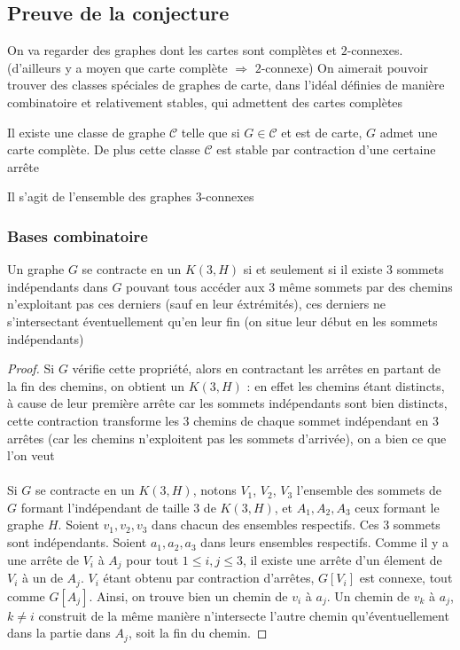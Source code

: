 \documentclass{scrartcl}
\begin{document}
\begin{flushleft}
\subsection{Preuve de la conjecture}

On va regarder des graphes dont les cartes sont complètes et $2$-connexes. (d'ailleurs y a moyen que carte complète
$\Rightarrow$ $2$-connexe)
On aimerait pouvoir trouver des classes spéciales de graphes de carte, dans l'idéal définies de manière combinatoire et
relativement stables, qui admettent des cartes complètes

\begin{conj}
    Il existe une classe de graphe $\mathcal{C}$ telle que si $G \in \mathcal{C}$ et est de carte, $G$ admet une carte complète.
    De plus cette classe $\mathcal{C}$ est stable par contraction d'une certaine arrête
\end{conj}

\begin{conj}
    Il s'agit de l'ensemble des graphes $3$-connexes
\end{conj}

\subsubsection{Bases combinatoire}

\begin{lem}
    Un graphe $G$ se contracte en un $K(3, H)$ si et seulement si il existe $3$ sommets
    indépendants dans $G$ pouvant tous accéder aux $3$ même sommets par des chemins n'exploitant pas ces derniers (sauf en
    leur éxtrémités), ces derniers ne s'intersectant éventuellement qu'en leur fin (on situe leur début en les sommets indépendants)
\end{lem}

\begin{proof}
    Si $G$ vérifie cette propriété, alors en contractant les arrêtes en partant de la fin des chemins, on obtient un $K(3, H)$ : en
    effet les chemins étant distincts, à cause de leur première arrête car les sommets indépendants sont bien distincts,
    cette contraction transforme les $3$ chemins de chaque sommet indépendant en $3$ arrêtes (car les chemins n'exploitent pas les sommets
    d'arrivée), on a bien ce que l'on veut
    \\~\\
    Si $G$ se contracte en un $K(3, H)$, notons $V_1$, $V_2$, $V_3$ l'ensemble des sommets de $G$ formant l'indépendant
    de taille $3$ de $K(3, H)$, et $A_1, A_2, A_3$ ceux formant le graphe $H$. Soient $v_1, v_2, v_3$ dans chacun des ensembles respectifs.
    Ces $3$ sommets sont indépendants. Soient $a_1, a_2, a_3$ dans leurs ensembles respectifs. Comme il y a une arrête de $V_i$ à $A_j$
    pour tout $1 \leq i,j \leq 3$, il existe une arrête d'un élement de $V_i$ à un de $A_j$. $V_i$ étant obtenu par contraction d'arrêtes,
    $G[V_i]$ est connexe, tout comme $G[A_j]$. Ainsi, on trouve bien un chemin de $v_i$ à $a_j$. Un chemin de $v_k$ à $a_j$, $k \neq i$ construit
    de la même manière n'intersecte l'autre chemin qu'éventuellement dans la partie dans $A_j$, soit la fin du chemin.
\end{proof}


\end{flushleft}
\end{document}
